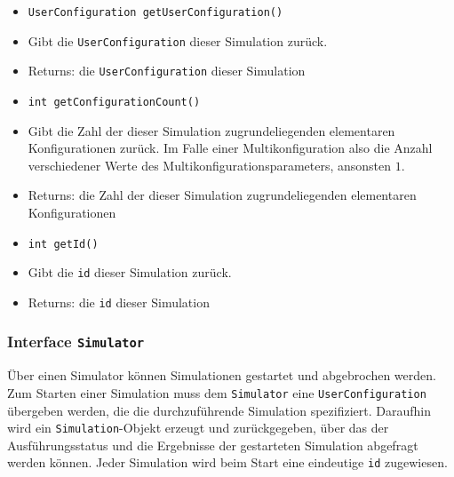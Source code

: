 \documentclass[parskip=full,11pt]{scrartcl}
\begin{document}
\begin{itemize}
\item \texttt{UserConfiguration getUserConfiguration()}
\item[] Gibt die \texttt{UserConfiguration} dieser Simulation zurück.
\item[] Returns: die \texttt{UserConfiguration} dieser Simulation

\item \texttt{int getConfigurationCount()}
\item[] Gibt die Zahl der dieser Simulation zugrundeliegenden elementaren Konfigurationen zurück. Im Falle einer Multikonfiguration also die Anzahl verschiedener Werte des Multikonfigurationsparameters, ansonsten \(1\).
\item[] Returns: die Zahl der dieser Simulation zugrundeliegenden elementaren Konfigurationen

\item \texttt{int getId()}
\item[] Gibt die \texttt{id} dieser Simulation zurück.
\item[] Returns: die \texttt{id} dieser Simulation
\end{itemize}

\subsubsection{Interface \texttt{Simulator}}
Über einen Simulator können Simulationen gestartet und abgebrochen werden. Zum Starten einer Simulation muss dem \texttt{Simulator} eine \texttt{UserConfiguration} übergeben werden, die die durchzuführende Simulation spezifiziert. Daraufhin wird ein \texttt{Simulation}-Objekt erzeugt und zurückgegeben, über das der Ausführungsstatus und die Ergebnisse der gestarteten Simulation abgefragt werden können. Jeder Simulation wird beim Start eine eindeutige \texttt{id} zugewiesen.
\end{document}
